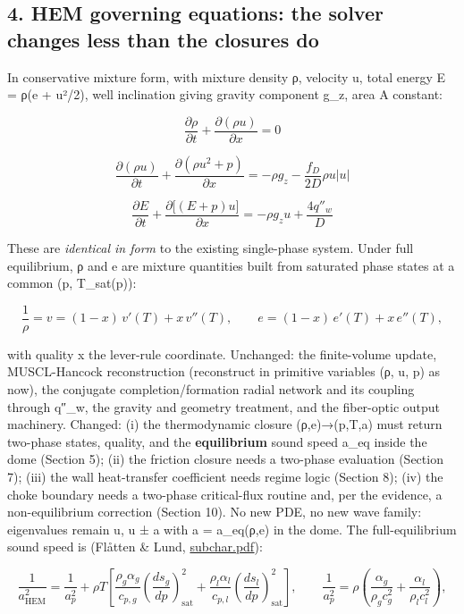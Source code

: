 \hypertarget{hem-governing-equations-the-solver-changes-less-than-the-closures-do}{%
\subsection{4. HEM governing equations: the solver changes less than the
closures
do}\label{hem-governing-equations-the-solver-changes-less-than-the-closures-do}}

In conservative mixture form, with mixture density ρ, velocity u, total
energy E = ρ(e + u²/2), well inclination giving gravity component g\_z,
area A constant:

\[\frac{\partial \rho}{\partial t} + \frac{\partial (\rho u)}{\partial x} = 0\]

\[\frac{\partial (\rho u)}{\partial t} + \frac{\partial (\rho u^2 + p)}{\partial x} = -\rho g_z - \frac{f_D}{2D}\rho u |u|\]

\[\frac{\partial E}{\partial t} + \frac{\partial\big[(E + p)u\big]}{\partial x} = -\rho g_z u + \frac{4 q''_w}{D}\]

These are \emph{identical in form} to the existing single-phase system.
Under full equilibrium, ρ and e are mixture quantities built from
saturated phase states at a common (p, T\_sat(p)):

\[\frac{1}{\rho} = v = (1-x)\,v'(T) + x\,v''(T), \qquad e = (1-x)\,e'(T) + x\,e''(T),\]

with quality x the lever-rule coordinate. Unchanged: the finite-volume
update, MUSCL-Hancock reconstruction (reconstruct in primitive variables
(ρ, u, p) as now), the conjugate completion/formation radial network and
its coupling through q″\_w, the gravity and geometry treatment, and the
fiber-optic output machinery. Changed: (i) the thermodynamic closure
(ρ,e)→(p,T,a) must return two-phase states, quality, and the
\textbf{equilibrium} sound speed a\_eq inside the dome (Section 5); (ii)
the friction closure needs a two-phase evaluation (Section 7); (iii) the
wall heat-transfer coefficient needs regime logic (Section 8); (iv) the
choke boundary needs a two-phase critical-flux routine and, per the
evidence, a non-equilibrium correction (Section 10). No new PDE, no new
wave family: eigenvalues remain u, u ± a with a = a\_eq(ρ,e) in the
dome. The full-equilibrium sound speed is (Flåtten \& Lund,
\href{https://www.sintef.no/globalassets/project/co2-dynamics/publications/subchar.pdf}{subchar.pdf}):

\[\frac{1}{a_{\mathrm{HEM}}^2} = \frac{1}{a_p^2} + \rho T\!\left[\frac{\rho_g \alpha_g}{c_{p,g}}\left(\frac{ds_g}{dp}\right)_{\!\mathrm{sat}}^2 + \frac{\rho_l \alpha_l}{c_{p,l}}\left(\frac{ds_l}{dp}\right)_{\!\mathrm{sat}}^2\right], \qquad \frac{1}{a_p^2} = \rho\left(\frac{\alpha_g}{\rho_g c_g^2} + \frac{\alpha_l}{\rho_l c_l^2}\right),\]

